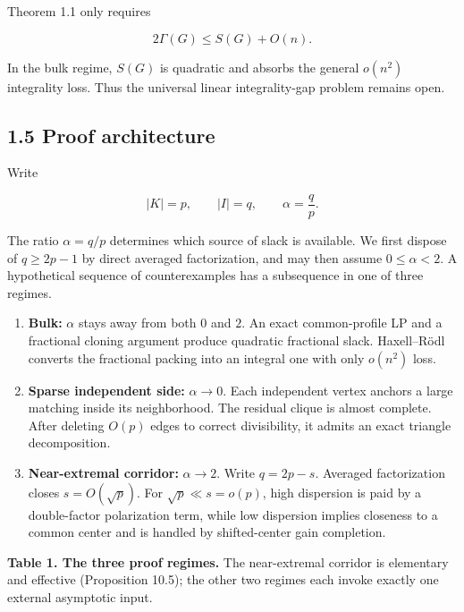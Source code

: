 \documentclass[
  11pt,
]{article}
\begin{document}
Theorem 1.1 only requires

\[
2\Gamma(G)\le S(G)+O(n).
\]

In the bulk regime, \(S(G)\) is quadratic and absorbs the general
\(o(n^2)\) integrality loss. Thus the universal linear integrality-gap
problem remains open.

\subsection{1.5 Proof architecture}\label{proof-architecture}

Write

\[
|K|=p,
\qquad
|I|=q,
\qquad
\alpha=\frac qp.
\]

The ratio \(\alpha=q/p\) determines which source of slack is available.
We first dispose of \(q\ge2p-1\) by direct averaged factorization, and
may then assume \(0\le\alpha<2\). A hypothetical sequence of
counterexamples has a subsequence in one of three regimes.

\begin{enumerate}
\def\labelenumi{\arabic{enumi}.}
\item
  \textbf{Bulk:} \(\alpha\) stays away from both \(0\) and \(2\). An
  exact common-profile LP and a fractional cloning argument produce
  quadratic fractional slack. Haxell--Rödl converts the fractional
  packing into an integral one with only \(o(n^2)\) loss.
\item
  \textbf{Sparse independent side:} \(\alpha\to0\). Each independent
  vertex anchors a large matching inside its neighborhood. The residual
  clique is almost complete. After deleting \(O(p)\) edges to correct
  divisibility, it admits an exact triangle decomposition.
\item
  \textbf{Near-extremal corridor:} \(\alpha\to2\). Write \(q=2p-s\).
  Averaged factorization closes \(s=O(\sqrt p)\). For
  \(\sqrt p\ll s=o(p)\), high dispersion is paid by a double-factor
  polarization term, while low dispersion implies closeness to a common
  center and is handled by shifted-center gain completion.
\end{enumerate}

\textbf{Table 1. The three proof regimes.} The near-extremal corridor is
elementary and effective (Proposition 10.5); the other two regimes each
invoke exactly one external asymptotic input.
\end{document}
